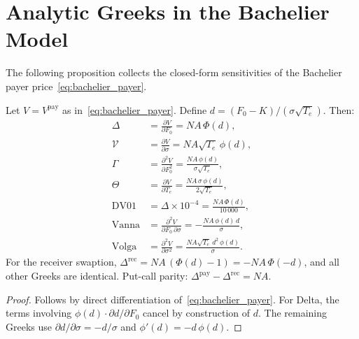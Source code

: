 \section{Analytic Greeks in the Bachelier Model}
\label{sec:bachelier_greeks}

The following proposition collects the closed-form sensitivities of the Bachelier payer
price~\eqref{eq:bachelier_payer}.

\begin{proposition}
\label{prop:bachelier_greeks}
Let $V=V^{\mathrm{pay}}$ as in~\eqref{eq:bachelier_payer}. Define
$d=(F_0-K)/(\sigma\sqrt{T_e})$. Then:
\begin{align}
    \Delta  &= \frac{\partial V}{\partial F_0}         = N\!A\,\Phi(d),
    \label{eq:delta} \\
    \mathcal{V} &= \frac{\partial V}{\partial \sigma}  = N\!A\sqrt{T_e}\,\phi(d),
    \label{eq:vega} \\
    \Gamma  &= \frac{\partial^2 V}{\partial F_0^2}     = \frac{N\!A\,\phi(d)}{\sigma\sqrt{T_e}},
    \label{eq:gamma} \\
    \Theta  &= \frac{\partial V}{\partial T_e}         = \frac{N\!A\,\sigma\,\phi(d)}{2\sqrt{T_e}},
    \label{eq:theta} \\
    \mathrm{DV01} &= \Delta\times 10^{-4}              = \frac{N\!A\,\Phi(d)}{10\,000},
    \label{eq:dv01} \\
    \mathrm{Vanna} &= \frac{\partial^2 V}{\partial F_0\,\partial\sigma} = -\frac{N\!A\,\phi(d)\,d}{\sigma},
    \label{eq:vanna} \\
    \mathrm{Volga} &= \frac{\partial^2 V}{\partial\sigma^2}
                   = \frac{N\!A\sqrt{T_e}\,d^2\,\phi(d)}{\sigma}.
    \label{eq:volga}
\end{align}
For the receiver swaption, $\Delta^{\mathrm{rec}}=N\!A\,(\Phi(d)-1)=-N\!A\,\Phi(-d)$,
and all other Greeks are identical. Put-call parity:
$\Delta^{\mathrm{pay}}-\Delta^{\mathrm{rec}}=N\!A$.
\end{proposition}

\begin{proof}
Follows by direct differentiation of~\eqref{eq:bachelier_payer}. For Delta, the terms
involving $\phi(d)\cdot\partial d/\partial F_0$ cancel by construction of $d$. The
remaining Greeks use $\partial d/\partial\sigma=-d/\sigma$ and $\phi'(d)=-d\,\phi(d)$.
\end{proof}


